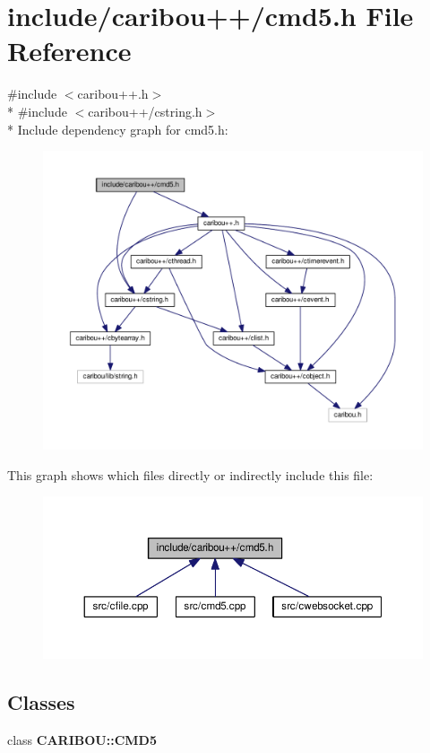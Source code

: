 \section{include/caribou++/cmd5.h File Reference}
\label{cmd5_8h}
{\ttfamily \#include $<$caribou++.\+h$>$}\\*
{\ttfamily \#include $<$caribou++/cstring.\+h$>$}\\*
Include dependency graph for cmd5.\+h\+:
\nopagebreak
\begin{figure}[H]
\begin{center}
\leavevmode
\includegraphics[width=350pt]{cmd5_8h__incl}
\end{center}
\end{figure}
This graph shows which files directly or indirectly include this file\+:
\nopagebreak
\begin{figure}[H]
\begin{center}
\leavevmode
\includegraphics[width=350pt]{cmd5_8h__dep__incl}
\end{center}
\end{figure}
\subsection*{Classes}
\begin{DoxyCompactItemize}
\item 
class {\bf C\+A\+R\+I\+B\+O\+U\+::\+C\+M\+D5}
\end{DoxyCompactItemize}
